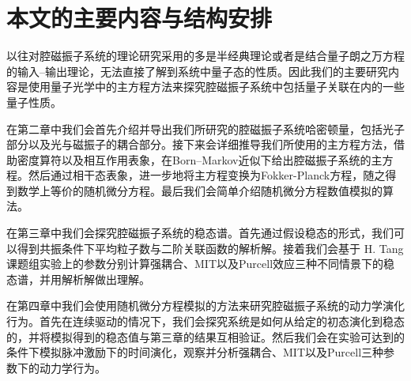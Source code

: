 \section{本文的主要内容与结构安排}
以往对腔磁振子系统的理论研究采用的多是半经典理论或者是结合量子朗之万方程的输入--输出理论，无法直接了解到系统中量子态的性质。因此我们的主要研究内容是使用量子光学中的主方程方法来探究腔磁振子系统中包括量子关联在内的一些量子性质。

在第二章中我们会首先介绍并导出我们所研究的腔磁振子系统哈密顿量，包括光子部分以及光与磁振子的耦合部分。接下来会详细推导我们所使用的主方程方法，借助密度算符以及相互作用表象，在Born--Markov近似下给出腔磁振子系统的主方程。然后通过相干态表象，进一步地将主方程变换为Fokker-Planck方程，随之得到数学上等价的随机微分方程。最后我们会简单介绍随机微分方程数值模拟的算法。

在第三章中我们会探究腔磁振子系统的稳态谱。首先通过假设稳态的形式，我们可以得到共振条件下平均粒子数与二阶关联函数的解析解。接着我们会基于 H. Tang 课题组实验上的参数分别计算强耦合、MIT以及Purcell效应三种不同情景下的稳态谱，并用解析解做出理解。

在第四章中我们会使用随机微分方程模拟的方法来研究腔磁振子系统的动力学演化行为。首先在连续驱动的情况下，我们会探究系统是如何从给定的初态演化到稳态的，并将模拟得到的稳态值与第三章的结果互相验证。然后我们会在实验可达到的条件下模拟脉冲激励下的时间演化，观察并分析强耦合、MIT以及Purcell三种参数下的动力学行为。
